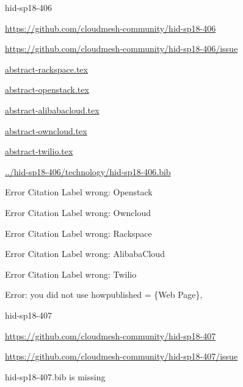 \begin{IU}

hid-sp18-406

\url{https://github.com/cloudmesh-community/hid-sp18-406}

\url{https://github.com/cloudmesh-community/hid-sp18-406/issue}

\href{https://github.com/cloudmesh-community/hid-sp18-406/blob/master//technology/abstract-rackspace.tex}{abstract-rackspace.tex}

\href{https://github.com/cloudmesh-community/hid-sp18-406/blob/master//technology/abstract-openstack.tex}{abstract-openstack.tex}

\href{https://github.com/cloudmesh-community/hid-sp18-406/blob/master//technology/abstract-alibabacloud.tex}{abstract-alibabacloud.tex}

\href{https://github.com/cloudmesh-community/hid-sp18-406/blob/master//technology/abstract-owncloud.tex}{abstract-owncloud.tex}

\href{https://github.com/cloudmesh-community/hid-sp18-406/blob/master//technology/abstract-twilio.tex}{abstract-twilio.tex}

\href{https://github.com/cloudmesh-community/hid-sp18-406/blob/master//technology/hid-sp18-406.bib}{../hid-sp18-406/technology/hid-sp18-406.bib}

 Error Citation Label wrong: Openstack

 Error Citation Label wrong: Owncloud

 Error Citation Label wrong: Rackspace

 Error Citation Label wrong: AlibabaCloud

 Error Citation Label wrong: Twilio

Error: you did not use howpublished = \{Web Page\},

\end{IU}


\begin{IU}

hid-sp18-407

\url{https://github.com/cloudmesh-community/hid-sp18-407}

\url{https://github.com/cloudmesh-community/hid-sp18-407/issue}

hid-sp18-407.bib is missing

\end{IU}


